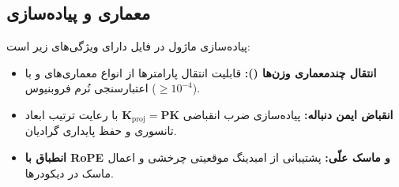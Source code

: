 \subsection{معماری و پیاده‌سازی}
پیاده‌سازی ماژول در فایل  دارای ویژگی‌های زیر است:
\begin{itemize}
    \item \textbf{انتقال چندمعماری وزن‌ها ():} قابلیت انتقال پارامترها از انواع معماری‌های  و  با اعتبارسنجی نُرم فروبنیوس ($\ge 10^{-4}$).
    \item \textbf{انقباض ایمن دنباله:} پیاده‌سازی ضرب انقباضی $\mathbf{K}_{\text{proj}} = \mathbf{P} \mathbf{K}$ با رعایت ترتیب ابعاد تانسوری و حفظ پایداری گرادیان.
    \item \textbf{انطباق با RoPE و ماسک علّی:} پشتیبانی از امبدینگ موقعیتی چرخشی و اعمال ماسک در دیکودرها.
\end{itemize}
